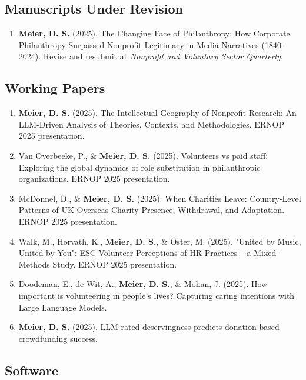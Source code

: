 \documentclass[11pt,letterpaper]{article}
\newcommand{\pubitem}[1]{
    \item #1
}
\begin{document}
\subsection*{Manuscripts Under Revision}

\begin{enumerate}[leftmargin=*, itemsep=0.5em, resume]

\pubitem{\textbf{Meier, D. S.} (2025). The Changing Face of Philanthropy: How Corporate Philanthropy Surpassed Nonprofit Legitimacy in Media Narratives (1840-2024). Revise and resubmit at \textit{Nonprofit and Voluntary Sector Quarterly}.}

\end{enumerate}

\subsection*{Working Papers}

\begin{enumerate}[leftmargin=*, itemsep=0.5em, resume]

\pubitem{\textbf{Meier, D. S.} (2025). The Intellectual Geography of Nonprofit Research: An LLM-Driven Analysis of Theories, Contexts, and Methodologies. ERNOP 2025 presentation.}

\pubitem{Van Overbeeke, P., \& \textbf{Meier, D. S.} (2025). Volunteers vs paid staff: Exploring the global dynamics of role substitution in philanthropic organizations. ERNOP 2025 presentation.}

\pubitem{McDonnel, D., \& \textbf{Meier, D. S.} (2025). When Charities Leave: Country-Level Patterns of UK Overseas Charity Presence, Withdrawal, and Adaptation. ERNOP 2025 presentation.}

\pubitem{Walk, M., Horvath, K., \textbf{Meier, D. S.}, \& Oster, M. (2025). "United by Music, United by You": ESC Volunteer Perceptions of HR-Practices – a Mixed-Methods Study. ERNOP 2025 presentation.}

\pubitem{Doodeman, E., de Wit, A., \textbf{Meier, D. S.}, \& Mohan, J. (2025). How important is volunteering in people's lives? Capturing caring intentions with Large Language Models.}

\pubitem{\textbf{Meier, D. S.} (2025). LLM-rated deservingness predicts donation-based crowdfunding success.}

\end{enumerate}

\subsection*{Software}
\end{document}
